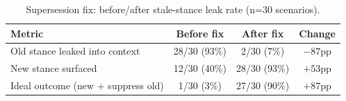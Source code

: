 \begin{table}[ht]
\centering
\caption{Supersession fix: before/after stale-stance leak rate (n=30 scenarios).}
\label{tab:supersession}
\begin{tabular}{lccc}
\toprule
\textbf{Metric} & \textbf{Before fix} & \textbf{After fix} & \textbf{Change} \\
\midrule
Old stance leaked into context & 28/30 (93\%) & 2/30 (7\%) & $-87$pp \\
New stance surfaced            & 12/30 (40\%) & 28/30 (93\%) & $+53$pp \\
Ideal outcome (new + suppress old) & 1/30 (3\%) & 27/30 (90\%) & $+87$pp \\
\bottomrule
\end{tabular}
\end{table}